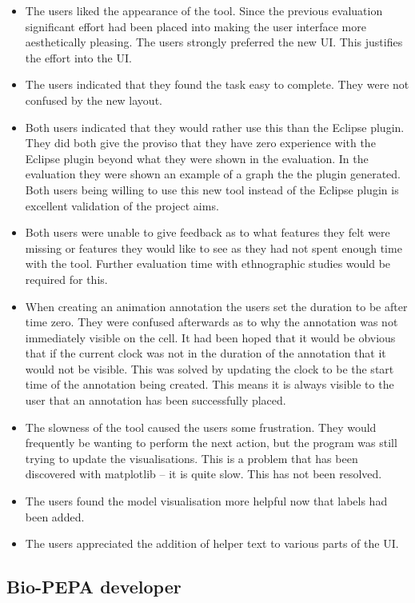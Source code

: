 \begin{itemize}
\item The users liked the appearance of the tool.  Since the previous evaluation significant effort had been placed into making the user interface more aesthetically pleasing.  The users strongly preferred the new \ac{UI}.  This justifies the effort into the \ac{UI}.
\item The users indicated that they found the task easy to complete.  They were not confused by the new layout.
\item Both users indicated that they would rather use this than the Eclipse plugin.  They did both give the proviso that they have zero experience with the Eclipse plugin beyond what they were shown in the evaluation.  In the evaluation they were shown an example of a graph the the plugin generated.  Both users being willing to use this new tool instead of the Eclipse plugin is excellent validation of the project aims.
\item Both users were unable to give feedback as to what features they felt were missing or features they would like to see as they had not spent enough time with the tool.  Further evaluation time with ethnographic studies would be required for this.
\item When creating an animation annotation the users set the duration to be after time zero.  They were confused afterwards as to why the annotation was not immediately visible on the cell.  It had been hoped that it would be obvious that if the current clock was not in the duration of the annotation that it would not be visible.  This was solved by updating the clock to be the start time of the annotation being created. This means it is always visible to the user that an annotation has been successfully placed.
\item The slowness of the tool caused the users some frustration.  They would frequently be wanting to perform the next action, but the program was still trying to update the visualisations.  This is a problem that has been discovered with matplotlib -- it is quite slow.  This has not been resolved.
\item The users found the model visualisation more helpful now that labels had been added.
\item The users appreciated the addition of helper text to various parts of the \ac{UI}.
\end{itemize}

\subsection{Bio-PEPA developer}


